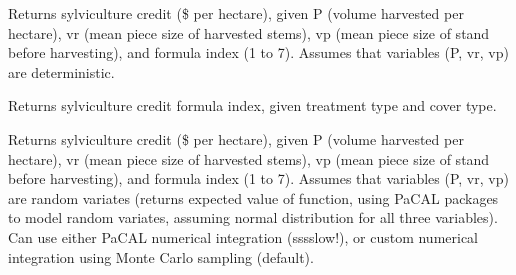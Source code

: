 \documentclass[letterpaper,10pt,english]{sphinxmanual}
\begin{document}

\begin{fulllineitems}
\label{\detokenize{common:common.sylv_cred}}
Returns sylviculture credit (\$ per hectare), given P (volume harvested per hectare), vr (mean piece size of harvested stems), vp (mean piece size of stand before harvesting), and formula index (1 to 7).
Assumes that variables (P, vr, vp) are deterministic.

\end{fulllineitems}


\begin{fulllineitems}
\label{\detokenize{common:common.sylv_cred_formula}}
Returns sylviculture credit formula index, given treatment type and cover type.

\end{fulllineitems}


\begin{fulllineitems}
\label{\detokenize{common:common.sylv_cred_rv}}
Returns sylviculture credit (\$ per hectare), given P (volume harvested per hectare), vr (mean piece size of harvested stems), vp (mean piece size of stand before harvesting), and formula index (1 to 7).
Assumes that variables (P, vr, vp) are random variates (returns expected value of function, using PaCAL packages to model random variates, assuming normal distribution for all three variables).
Can use either PaCAL numerical integration (sssslow!), or custom numerical integration using Monte Carlo sampling (default).

\end{fulllineitems}

\end{document}
